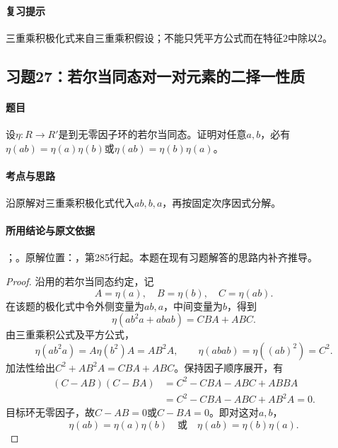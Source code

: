 \paragraph{复习提示}

三重乘积极化式来自三重乘积假设；不能只凭平方公式而在特征$2$中除以$2$。



\subsection{习题27：若尔当同态对一对元素的二择一性质}

\label{ex:3:27}

\paragraph{题目}

设$\eta:R\to R'$是到无零因子环的若尔当同态。证明对任意$a,b$，必有$\eta(ab)=\eta(a)\eta(b)$或$\eta(ab)=\eta(b)\eta(a)$。

\paragraph{考点与思路}

沿原解对三重乘积极化式代入$ab,b,a$，再按固定次序因式分解。

\paragraph{所用结论与原文依据}

；。原解位置：，第285行起。本题在现有习题解答的思路内补齐推导。


\begin{proof}

沿用的若尔当同态约定，记
\[
A=\eta(a),\quad B=\eta(b),\quad C=\eta(ab).
\]
在该题的极化式中令外侧变量为$ab,a$，中间变量为$b$，得到
\[
\eta(ab^2a+abab)=CBA+ABC.
\]
由三重乘积公式及平方公式，
\[
\eta(ab^2a)=A\eta(b^2)A=AB^2A,\qquad
\eta(abab)=\eta((ab)^2)=C^2.
\]
加法性给出$C^2+AB^2A=CBA+ABC$。保持因子顺序展开，有
\begin{align*}
(C-AB)(C-BA)
&=C^2-CBA-ABC+ABBA\\
&=C^2-CBA-ABC+AB^2A=0.
\end{align*}
目标环无零因子，故$C-AB=0$或$C-BA=0$。即对这对$a,b$，
\[
\eta(ab)=\eta(a)\eta(b)\quad\text{或}\quad\eta(ab)=\eta(b)\eta(a).
\]

\end{proof}

